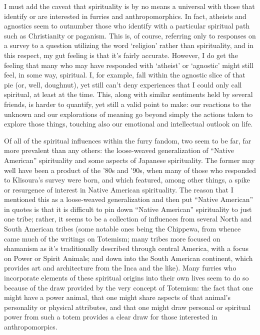 I must add the caveat that spirituality is by no means a universal with those that identify or are interested in furries and anthropomorphics. In fact, atheists and agnostics seem to outnumber those who identify with a particular spiritual path such as Christianity or paganism. This is, of course, referring only to responses on a survey to a question utilizing the word `religion' rather than spirituality, and in this respect, my gut feeling is that it's fairly accurate. However, I do get the feeling that many who may have responded with `atheist' or `agnostic' might still feel, in some way, spiritual. I, for example, fall within the agnostic slice of that pie (or, well, doughnut), yet still can't deny experiences that I could only call spiritual, at least at the time. This, along with similar sentiments held by several friends, is harder to quantify, yet still a valid point to make: our reactions to the unknown and our explorations of meaning go beyond simply the actions taken to explore those things, touching also our emotional and intellectual outlook on life.

Of all of the spiritual influences within the furry fandom, two seem to be far, far more prevalent than any others: the loose-weaved generalization of ``Native American'' spirituality and some aspects of Japanese spirituality. The former may well have been a product of the '80s and '90s, when many of those who responded to Klisoura's survey were born, and which featured, among other things, a spike or resurgence of interest in Native American spirituality. The reason that I mentioned this as a loose-weaved generalization and then put ``Native American'' in quotes is that it is difficult to pin down ``Native American'' spirituality to just one tribe; rather, it seems to be a collection of influences from several North and South American tribes (some notable ones being the Chippewa, from whence came much of the writings on Totemism; many tribes more focused on shamanism as it's traditionally described through central America, with a focus on Power or Spirit Animals; and down into the South American continent, which provides art and architecture from the Inca and the like). Many furries who incorporate elements of these spiritual origins into their own lives seem to do so because of the draw provided by the very concept of Totemism: the fact that one might have a power animal, that one might share aspects of that animal's personality or physical attributes, and that one might draw personal or spiritual power from such a totem provides a clear draw for those interested in anthropomorpics.

